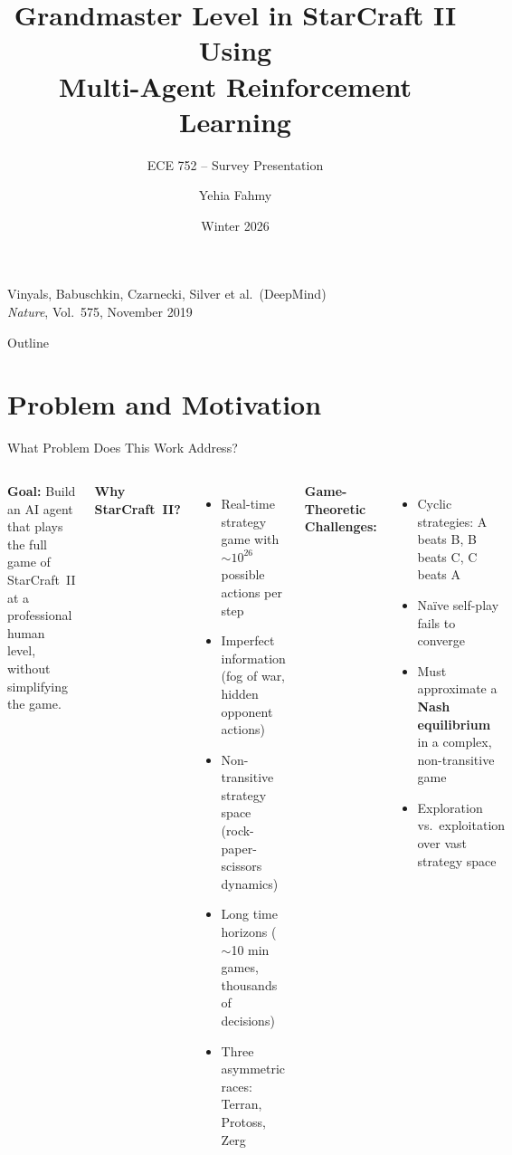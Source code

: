 \documentclass[aspectratio=169]{beamer}
\title[AlphaStar]{Grandmaster Level in StarCraft II Using\\Multi-Agent Reinforcement Learning}
\subtitle{ECE 752 -- Survey Presentation}
\author{Yehia Fahmy} %
\institute{University of Waterloo}
\date{Winter 2026}
\begin{document}
\begin{frame}
\titlepage
\vfill
\centering
\small Vinyals, Babuschkin, Czarnecki, Silver et al.\ (DeepMind) \\
\textit{Nature}, Vol.\ 575, November 2019
\end{frame}

\begin{frame}{Outline}
\tableofcontents
\end{frame}

\section{Problem and Motivation}

\begin{frame}{What Problem Does This Work Address?}
\begin{columns}[T]
\textbf{Goal:} Build an AI agent that plays the full game of StarCraft~II at a professional human level, without simplifying the game.

\vspace{0.5em}
\textbf{Why StarCraft~II?}
\begin{itemize}
    \item Real-time strategy game with $\sim\!10^{26}$ possible actions per step
    \item Imperfect information (fog of war, hidden opponent actions)
    \item Non-transitive strategy space (rock-paper-scissors dynamics)
    \item Long time horizons ($\sim$10 min games, thousands of decisions)
    \item Three asymmetric races: Terran, Protoss, Zerg
\end{itemize}

\textbf{Game-Theoretic Challenges:}
\begin{itemize}
    \item Cyclic strategies: A beats B, B beats C, C beats A
    \item Na\"ive self-play fails to converge
    \item Must approximate a \textbf{Nash equilibrium} in a complex, non-transitive game
    \item Exploration vs.\ exploitation over vast strategy space
\end{itemize}
\end{columns}
\end{frame}
\end{document}
